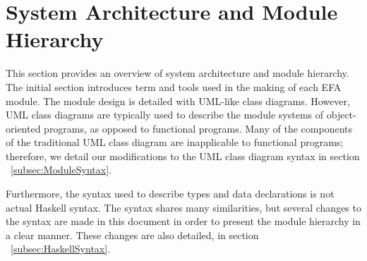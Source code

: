 \noindent
\chapter{System Architecture and Module Hierarchy}

This section provides an overview of system architecture and module hierarchy. 
The 
initial section introduces term and tools used in the making of each EFA 
module. The module design is detailed with UML-like class diagrams. However, 
UML class diagrams are typically
used to describe the module systems of object-oriented programs, as opposed to
functional programs. Many of the components of the traditional UML class
diagram are inapplicable to functional programs; therefore, we detail our
modifications to the UML class diagram syntax in 
section ~\ref{subsec:ModuleSyntax}.

Furthermore, the syntax used to describe types and data declarations is not
actual Haskell syntax. The syntax shares many similarities, but several changes
to the syntax are made in this document in order to present the module hierarchy
in a clear manner. These changes are also detailed, in 
section ~\ref{subsec:HaskellSyntax}.

